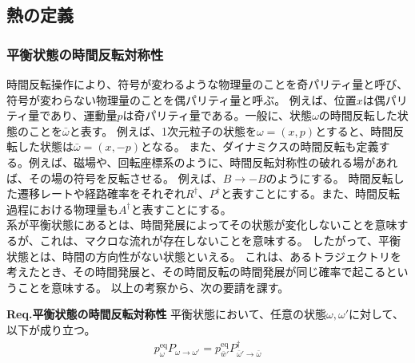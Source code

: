 \documentclass[a4paper,11pt]{jsarticle}
\numberwithin{equation}{section}
\begin{document}
\newpage
\subsection{熱の定義}
\subsubsection{平衡状態の時間反転対称性}
時間反転操作により、符号が変わるような物理量のことを奇パリティ量と呼び、符号が変わらない物理量のことを偶パリティ量と呼ぶ。
例えば、位置$x$は偶パリティ量であり、運動量$p$は奇パリティ量である。一般に、状態$\omega$の時間反転した状態のことを$\bar{\omega}$と表す。
例えば、1次元粒子の状態を$\omega = (x,p)$とすると、時間反転した状態は$\bar{\omega} = (x,-p)$となる。
また、ダイナミクスの時間反転も定義する。例えば、磁場や、回転座標系のように、時間反転対称性の破れる場があれば、その場の符号を反転させる。
例えば、$B \to -B$のようにする。
時間反転した遷移レートや経路確率をそれぞれ$R^{\dagger}$、$P^{\dagger}$と表すことにする。また、時間反転過程における物理量も$A^{\dagger}$と表すことにする。\\

系が平衡状態にあるとは、時間発展によってその状態が変化しないことを意味するが、これは、マクロな流れが存在しないことを意味する。
したがって、平衡状態とは、時間の方向性がない状態といえる。
これは、あるトラジェクトリを考えたとき、その時間発展と、その時間反転の時間発展が同じ確率で起こるということを意味する。
以上の考察から、次の要請を課す。

\begin{itembox}[l]{\textbf{Req.平衡状態の時間反転対称性}}
    平衡状態において、任意の状態$\omega,\omega'$に対して、以下が成り立つ。
    \begin{align}
        p_{\omega}^{\text{eq}} P_{\omega \to \omega'} = p_{\bar{w}'}^{\text{eq}} P^{\dagger}_{\bar{\omega}' \to \bar{\omega}}
    \end{align}

\end{itembox}
\end{document}
